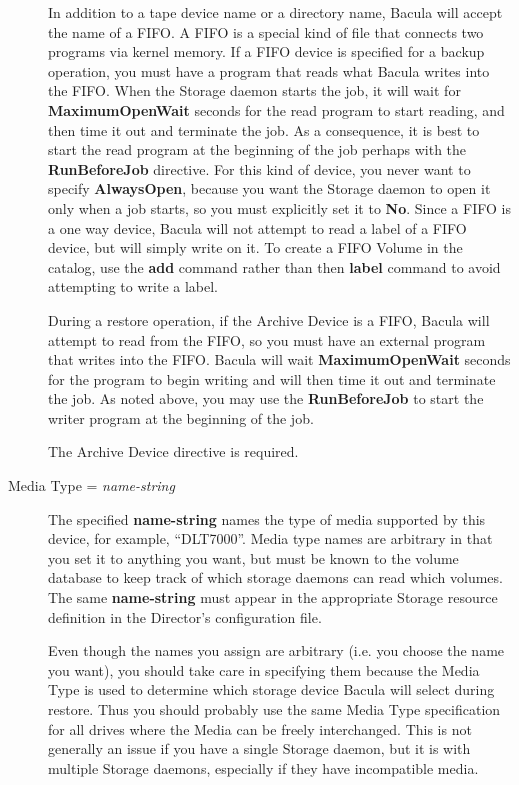 \begin{description}
In addition to a tape device name or a directory name, Bacula will  accept the
name of a FIFO. A FIFO is a special kind of file that  connects two programs
via kernel memory. If a FIFO device is specified  for a backup operation, you
must have a program that reads what Bacula  writes into the FIFO. When the
Storage daemon starts the job, it  will wait for {\bf MaximumOpenWait} seconds
for the read program to start reading, and then time it out and  terminate
the job. As a consequence, it is best to start the read  program at the
beginning of the job perhaps with the {\bf RunBeforeJob}  directive. For this
kind of device, you never want to specify  {\bf AlwaysOpen}, because you want
the Storage daemon to open it only  when a job starts, so you must explicitly
set it to {\bf No}.  Since a FIFO is a one way device, Bacula will not attempt
to read  a label of a FIFO device, but will simply write on it. To create a 
FIFO Volume in the catalog, use the {\bf add} command rather than  then {\bf
label} command to avoid attempting to write a label.  

During a restore operation, if the Archive Device is a FIFO, Bacula  will
attempt to read from the FIFO, so you must have an external program  that
writes into the FIFO. Bacula will wait {\bf MaximumOpenWait} seconds  for the
program to begin writing and will then time it out and  terminate the job. As
noted above, you may use the {\bf RunBeforeJob}  to start the writer program
at the beginning of the job.  

The Archive Device directive is required. 

\item [Media Type = {\it name-string}]
   The specified {\bf name-string} names the type of media supported  by this
device, for example, ``DLT7000''. Media type names  are arbitrary in that you
set it to anything you want, but  must be known to the volume database to keep
track of which  storage daemons can read which volumes. The same  {\bf
name-string} must appear in the appropriate Storage  resource definition in
the Director's configuration file.  

Even though the names you assign are arbitrary (i.e. you  choose the name you
want), you should take care in specifying  them because the Media Type is used
to determine which  storage device Bacula will select during restore. Thus you
should probably use the same Media Type specification for all  drives where
the Media can be freely interchanged. This is  not generally an issue if you
have a single Storage daemon,  but it is with multiple Storage daemons,
especially if they  have incompatible media.  


\end{description}
